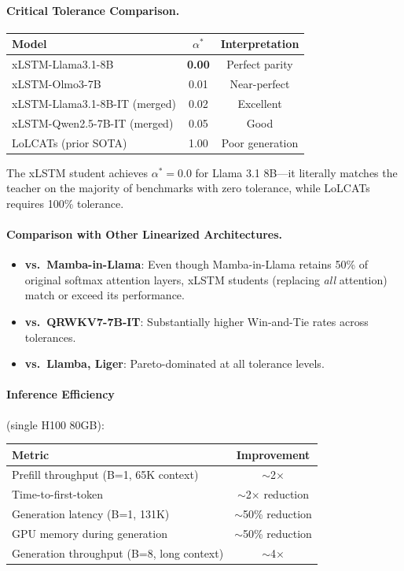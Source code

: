 \documentclass[11pt]{article}
\begin{document}
\paragraph{Critical Tolerance Comparison.}

\begin{center}
\begin{tabular}{lcc}
\toprule
\textbf{Model} & $\alpha^*$ & \textbf{Interpretation} \\
\midrule
xLSTM-Llama3.1-8B & \textbf{0.00} & Perfect parity \\
xLSTM-Olmo3-7B & 0.01 & Near-perfect \\
xLSTM-Llama3.1-8B-IT (merged) & 0.02 & Excellent \\
xLSTM-Qwen2.5-7B-IT (merged) & 0.05 & Good \\
\midrule
LoLCATs (prior SOTA) & 1.00 & Poor generation \\
\bottomrule
\end{tabular}
\end{center}

The xLSTM student achieves $\alpha^* = 0.0$ for Llama 3.1 8B---it literally matches the teacher on the majority of benchmarks with zero tolerance, while LoLCATs requires 100\% tolerance.

\paragraph{Comparison with Other Linearized Architectures.}
\begin{itemize}
    \item \textbf{vs.\ Mamba-in-Llama}: Even though Mamba-in-Llama retains 50\% of original softmax attention layers, xLSTM students (replacing \emph{all} attention) match or exceed its performance.
    \item \textbf{vs.\ QRWKV7-7B-IT}: Substantially higher Win-and-Tie rates across tolerances.
    \item \textbf{vs.\ Llamba, Liger}: Pareto-dominated at all tolerance levels.
\end{itemize}

\paragraph{Inference Efficiency} (single H100 80GB):

\begin{center}
\begin{tabular}{lc}
\toprule
\textbf{Metric} & \textbf{Improvement} \\
\midrule
Prefill throughput (B=1, 65K context) & $\sim$2$\times$ \\
Time-to-first-token & $\sim$2$\times$ reduction \\
Generation latency (B=1, 131K) & $\sim$50\% reduction \\
GPU memory during generation & $\sim$50\% reduction \\
Generation throughput (B=8, long context) & $\sim$4$\times$ \\
\bottomrule
\end{tabular}
\end{center}
\end{document}
